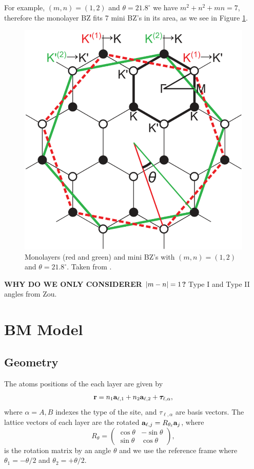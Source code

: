 \n

For example, $(m,n) = (1,2)$ and $\theta = 21.8^\circ$ we have $m^2 + n^2 + mn = 7$, therefore the monolayer BZ fits 7 mini BZ's in its area, as we see in Figure \ref{fig:bzminibz}.
\begin{figure}[H]
\centering
\includegraphics[width=0.5\linewidth]{fig/bzminibz.png}
\caption{Monolayers (red and green) and mini BZ's with $(m,n) = (1,2)$ and $\theta = 21.8^\circ$. Taken from \cite{koshino2012}.}
\label{fig:bzminibz}
\end{figure}

\n

\textbf{WHY DO WE ONLY CONSIDERER $\abs{m-n} = 1$?} Type I and Type II angles from Zou.

\pagebreak

\section{BM Model}

\subsection{Geometry}

The atoms positions of the each layer are given by
\begin{equation} \label{eq:position-atoms-tbg}
{\vb{r}} = n_1 {\vb{a}}_{\ell,1} + n_2 {\vb{a}}_{\ell,2} + {\bm{\tau}}_{\ell,\alpha},
\end{equation}
where $\alpha = A,B$ indexes the type of the site, and $\tau_{\ell,\alpha}$ are basis vectors. The lattice vectors of each layer are the rotated ${\vb{a}}_{\ell,j} = R_{\theta_\ell} {\vb{a}}_{j}$, where
\begin{equation} \label{eq:rotation-matrix}
R_\theta =
\begin{pmatrix}
\cos\theta & -\sin\theta \\
\sin\theta & \cos\theta
\end{pmatrix},
\end{equation}
is the rotation matrix by an angle $\theta$ and we use the reference frame where $\theta_1 = -\theta/2$ and $\theta_2 = +\theta/2$.

